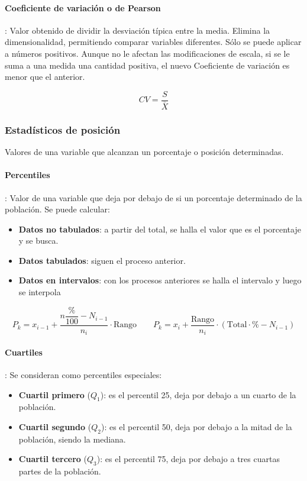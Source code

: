 \paragraph{Coeficiente de variación o de Pearson}: Valor obtenido de dividir la desviación típica entre la media. Elimina la dimensionalidad, permitiendo comparar variables diferentes. Sólo se puede aplicar a números positivos. Aunque no le afectan las modificaciones de escala, si se le suma a una medida una cantidad positiva, el nuevo Coeficiente de variación es menor que el anterior.
\begin{center}
    \begin{equation}
        CV = \dfrac{S}{\bar{X}}
    \end{equation}
\end{center}
\subsubsection{Estadísticos de posición}
Valores de una variable que alcanzan un porcentaje o posición determinadas.
\paragraph{Percentiles}: Valor de una variable que deja por debajo de si un porcentaje determinado de la población. Se puede calcular:
\begin{itemize}[itemsep=0pt,parsep=0pt,topsep=0pt,partopsep=0pt]
    \item \textbf{Datos no tabulados}: a partir del total, se halla el valor que es el porcentaje y se busca.
    \item\textbf{Datos tabulados}: siguen el proceso anterior.
    \item\textbf{Datos en intervalos}: con los procesos anteriores se halla el intervalo y luego se interpola
\end{itemize}
\begin{center}
    \begin{equation}
        P_k = x_{i-1} + \dfrac{n\dfrac{\%}{100} - N_{i-1}}{n_i}\cdot\mbox{Rango}\qquad P_k = x_i + \dfrac{\mbox{Rango}}{n_i}\cdot\left(\mbox{Total}\cdot\% - N_{i-1}\right)
    \end{equation}
\end{center}
\paragraph{Cuartiles}: Se consideran como percentiles especiales:
\begin{itemize}[itemsep=0pt,parsep=0pt,topsep=0pt,partopsep=0pt]
    \item \textbf{Cuartil primero} ($Q_1$): es el percentil 25, deja por debajo a un cuarto de la población.
    \item \textbf{Cuartil segundo} ($Q_2$): es el percentil 50, deja por debajo a la mitad de la población, siendo la mediana.
    \item \textbf{Cuartil tercero} ($Q_3$): es el percentil 75, deja por debajo a tres cuartas partes de la población.
\end{itemize}
